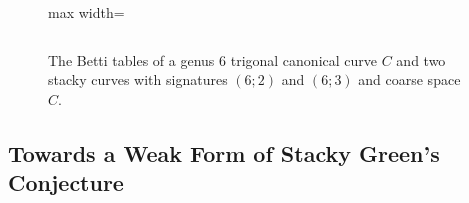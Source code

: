 \documentclass[11pt,reqno]{amsart}
\makeatletter
\theoremstyle{remark}
\newcommand{\z}{\textendash}               %
\newcommand{\h}[1]{{\scriptsize #1}}       %
\newenvironment{betti}[1]
  {\begingroup\setlength{\tabcolsep}{1.5pt}%
      \renewcommand{\arraystretch}{.95}%
   \begin{tabular}[t]{@{}>{\scriptsize}r@{\hspace{5pt}}|*{#1}{B}@{}}}
  {\end{tabular}\endgroup}
\newcommand{\bettipanel}[2]{%
  \begin{tabular}[t]{@{}c@{}}\small #1\\[3pt] #2\end{tabular}}
\makeatother
\begin{document}
\begin{figure}
\begin{adjustbox}{max width=\linewidth}
\begin{tabular}{@{}l@{}}

\end{tabular}
\end{adjustbox}
\caption{The Betti tables of a genus 6 trigonal canonical curve $C$ and two stacky curves with signatures $(6;2)$ and $(6;3)$ and coarse space $C$.}\label{fig:betti}
\end{figure}

\subsection{Towards a Weak Form of Stacky Green's Conjecture}\label{subsec:stacky-green}
\end{document}
